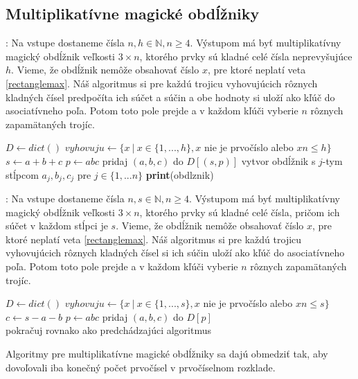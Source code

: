 \subsection{Multiplikatívne magické obdĺžniky}

\begin{subalg}: Na vstupe dostaneme čísla $n,h \in \mathbb{N}, n \geq 4$. Výstupom má byť multiplikatívny magický obdĺžnik veľkosti $3 \times n$, ktorého prvky sú kladné celé čísla neprevyšujúce $h$. Vieme, že obdĺžnik nemôže obsahovať číslo $x$, pre ktoré neplatí veta \ref{rectanglemax}. Náš algoritmus si pre každú trojicu vyhovujúcich rôznych kladných čísel predpočíta ich súčet a súčin a obe hodnoty si uloží ako kľúč do asociatívneho poľa. Potom toto pole prejde a v každom kľúči vyberie $n$ rôznych zapamätaných trojíc.
\end{subalg}

\begin{algorithmic}
\STATE $D \gets dict()$
\STATE $vyhovuju \gets \{x ~|~ x \in \{1, ... , h\}, x$ nie je prvočíslo alebo $xn \leq h\}$
	\STATE $s \gets a+b+c$
	\STATE $p \gets abc$
	\STATE pridaj $(a,b,c)$ do $D[(s,p)]$
\ENDFOR
{}
				\STATE vytvor obdĺžnik s $j$-tym stĺpcom $a_{j}, b_{j}, c_{j}$ pre $j \in \{1, ... n\}$
					\STATE \textbf{print}(obdlznik)
				\ENDIF
			\ENDFOR
		\ENDIF
	\ENDFOR
\ENDFOR
\end{algorithmic}

\begin{subalg}: Na vstupe dostaneme čísla $n,s \in \mathbb{N}, n \geq 4$. Výstupom má byť multiplikatívny magický obdĺžnik veľkosti $3 \times n$, ktorého prvky sú kladné celé čísla, pričom ich súčet v každom stĺpci je $s$. Vieme, že obdĺžnik nemôže obsahovať číslo $x$, pre ktoré neplatí veta \ref{rectanglemax}. Náš algoritmus si pre každú trojicu vyhovujúcich rôznych kladných čísel si ich súčin uloží ako kľúč do asociatívneho poľa. Potom toto pole prejde a v každom kľúči vyberie $n$ rôznych zapamätaných trojíc.
\end{subalg}

\begin{algorithmic}
\STATE $D \gets dict()$
\STATE $vyhovuju \gets \{x ~|~ x \in \{1, ... , s\}, x$ nie je prvočíslo alebo $xn \leq s\}$
	\STATE $c \gets s-a-b$
		\STATE $p \gets abc$
		\STATE pridaj $(a,b,c)$ do $D[p]$ \\
	\ENDIF
\ENDFOR
pokračuj rovnako ako predchádzajúci algoritmus
\end{algorithmic}

\begin{subnote} Algoritmy pre multiplikatívne magické obdĺžniky sa dajú obmedziť tak, aby dovoľovali iba konečný počet prvočísel v prvočíselnom rozklade.
\end{subnote} 

